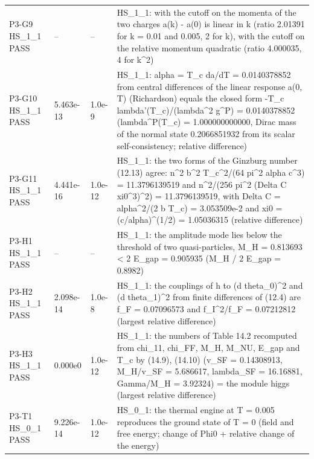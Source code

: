 \documentclass[aps,prd,onecolumn,superscriptaddress,nofootinbib,floatfix,longbibliography]{revtex4-2}
\begin{document}
\begin{longtable}{p{}p{}p{}p{}}
P3-G9 HS\_1\_1 \newline PASS & -- & -- & HS\_1\_1: with the cutoff on the momenta of the two charges a(k) - a(0) is linear in \textbar{}k\textbar{} (ratio 2.01391 for k = 0.01 and 0.005, 2 for \textbar{}k\textbar{}), with the cutoff on the relative momentum quadratic (ratio 4.000035, 4 for k\textasciicircum{}2) \\
P3-G10 HS\_1\_1 \newline PASS & 5.463e-13 & 1.0e-9 & HS\_1\_1: alpha = T\_c da/dT = 0.0140378852 from central differences of the linear response a(0, T) (Richardson) equals the closed form -T\_c lambda'(T\_c)/(lambda\textasciicircum{}2 g\textasciicircum{}P) = 0.0140378852 (lambda\textasciicircum{}P(T\_c) = 1.000000000000, Dirac mass of the normal state 0.2066851932 from its scalar self-consistency; relative difference) \\
P3-G11 HS\_1\_1 \newline PASS & 4.441e-16 & 1.0e-12 & HS\_1\_1: the two forms of the Ginzburg number (12.13) agree: n\textasciicircum{}2 b\textasciicircum{}2 T\_c\textasciicircum{}2/(64 pi\textasciicircum{}2 alpha c\textasciicircum{}3) = 11.3796139519 and n\textasciicircum{}2/(256 pi\textasciicircum{}2 (Delta C xi0\textasciicircum{}3)\textasciicircum{}2) = 11.3796139519, with Delta C = alpha\textasciicircum{}2/(2 b T\_c) = 3.053509e-2 and xi0 = (c/alpha)\textasciicircum{}(1/2) = 1.05036315 (relative difference) \\
P3-H1 HS\_1\_1 \newline PASS & -- & -- & HS\_1\_1: the amplitude mode lies below the threshold of two quasi-particles, M\_H = 0.813693 \textless{} 2 E\_gap = 0.905935 (M\_H / 2 E\_gap = 0.8982) \\
P3-H2 HS\_1\_1 \newline PASS & 2.098e-14 & 1.0e-8 & HS\_1\_1: the couplings of h to (d theta\_0)\textasciicircum{}2 and (d theta\_1)\textasciicircum{}2 from finite differences of (12.4) are f\_F = 0.07096573 and f\_I\textasciicircum{}2/f\_F = 0.07212812 (largest relative difference) \\
P3-H3 HS\_1\_1 \newline PASS & 0.000e0 & 1.0e-12 & HS\_1\_1: the numbers of Table 14.2 recomputed from chi\_11, chi\_FF, M\_H, M\_NU, E\_gap and T\_c by (14.9), (14.10) (v\_SF = 0.14308913, M\_H/v\_SF = 5.686617, lambda\_SF = 16.16881, Gamma/M\_H = 3.92324) = the module higgs (largest relative difference) \\
P3-T1 HS\_0\_1 \newline PASS & 9.226e-14 & 1.0e-12 & HS\_0\_1: the thermal engine at T = 0.005 reproduces the ground state of T = 0 (field and free energy; \textbar{}change of Phi0\textbar{} + relative change of the energy) \\

\end{longtable}
\end{document}
